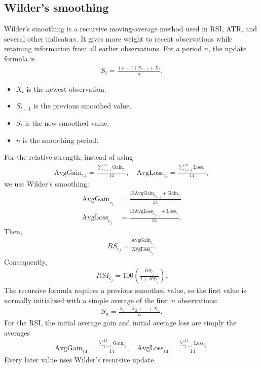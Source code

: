 \documentclass[letterpaper, 11pt]{article}
\newcommand{\1}{\mathds{1}}		%
\theoremstyle{definition}
\begin{document}
    \subsection{Wilder's smoothing}
    \bigbreak \noindent 
    Wilder’s smoothing is a recursive moving-average method used in RSI, ATR, and several other indicators. It gives more weight to recent observations while retaining information from all earlier observations.
    \bigbreak \noindent 
    For a period $n$, the update formula is 
    \begin{align*}
       S_{t} = \frac{(n-1)S_{t-1} + X_{t}}{n} 
    .\end{align*}
    \begin{itemize}
        \item $X_{t}$ is the newest observation.
        \item $S_{t-1}$ is the previous smoothed value.
        \item $S_{t}$ is the new smoothed value.
        \item $n$ is the smoothing period.
    \end{itemize}
    For the relative strength, instead of using
    \begin{align*}
        \text{AvgGain}_{14} = \frac{\sum_{j=1}^{14}\text{Gain}_{c_{j}}}{14}, \quad
        \text{AvgLoss}_{14} = \frac{\sum_{j=1}^{14}\text{Loss}_{c_{j}}}{14}
    ,\end{align*}
    we use Wilder's smoothing:
    \begin{align*}
        \text{AvgGain}_{c_{j}} &= \frac{13\text{AvgGain}_{c_{j-1}}  + \text{Gain}_{c_{j}}}{14} \\
        \text{AvgLoss}_{c_{j}} &= \frac{13\text{AvgLoss}_{c_{j-1}}  + \text{Loss}_{c_{j}}}{14} 
    .\end{align*}
    Then,
    \begin{align*}
        RS_{c_{j}} = \frac{\text{AvgGain}_{c_{j}}}{\text{AvgLoss}_{c_{j}}}
    .\end{align*}
    Consequently,
    \begin{align*}
        RSI_{c_{j}} = 100\left(\frac{RS_{c_{j}}}{1+RS_{c_{j}}}\right)
    .\end{align*}
    The recursive formula requires a previous smoothed value, so the first value is normally initialized with a simple average of the first $n$ observations:
    \begin{align*}
        S_{n} = \frac{X_{1} + X_{2} + \cdots + X_{n}}{n}
    .\end{align*}
    For the RSI, the initial average gain and initial average loss are simply the averages
    \begin{align*}
        \text{AvgGain}_{14} = \frac{\sum_{j=1}^{14}\text{Gain}_{c_{j}}}{14}, \quad
        \text{AvgLoss}_{14} = \frac{\sum_{j=1}^{14}\text{Loss}_{c_{j}}}{14}
    .\end{align*}
    Every later value uses Wilder's recursive update.
\end{document}
